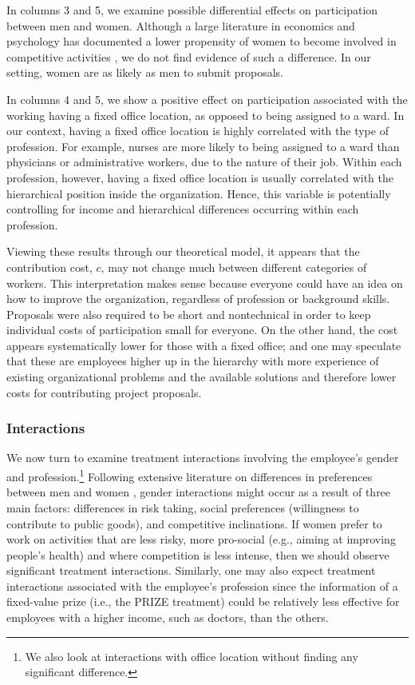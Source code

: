 \documentclass[11pt, titlepage]{article}
\begin{document}
In columns 3 and 5, we examine possible differential effects on
participation between men and women. Although a large literature in
economics and psychology \citep{croson2009gender} has documented a lower
propensity of women to become involved in competitive activities
\citep{niederle2007women}, we do not find evidence of such a difference.
In our setting, women are as likely as men to submit proposals.

In columns 4 and 5, we show a positive effect on participation
associated with the working having a fixed office location, as opposed
to being assigned to a ward. In our context, having a fixed office
location is highly correlated with the type of profession. For example,
nurses are more likely to being assigned to a ward than physicians or
administrative workers, due to the nature of their job. Within each
profession, however, having a fixed office location is usually
correlated with the hierarchical position inside the organization.
Hence, this variable is potentially controlling for income and
hierarchical differences occurring within each profession.

Viewing these results through our theoretical model, it appears that the
contribution cost, \(c\), may not change much between different
categories of workers. This interpretation makes sense because everyone
could have an idea on how to improve the organization, regardless of
profession or background skills. Proposals were also required to be
short and nontechnical in order to keep individual costs of
participation small for everyone. On the other hand, the cost appears
systematically lower for those with a fixed office; and one may
speculate that these are employees higher up in the hierarchy with more
experience of existing organizational problems and the available
solutions and therefore lower costs for contributing project proposals.

\subsubsection{Interactions}\label{interactions}

We now turn to examine treatment interactions involving the employee's
gender and profession.\footnote{We also look at interactions with office
  location without finding any significant difference.} Following
extensive literature on differences in preferences between men and women
\citep{croson2009gender}, gender interactions might occur as a result of
three main factors: differences in risk taking, social preferences
(willingness to contribute to public goods), and competitive
inclinations. If women prefer to work on activities that are less risky,
more pro-social (e.g., aiming at improving people's health) and where
competition is less intense, then we should observe significant
treatment interactions. Similarly, one may also expect treatment
interactions associated with the employee's profession since the
information of a fixed-value prize (i.e., the PRIZE treatment) could be
relatively less effective for employees with a higher income, such as
doctors, than the others.
\end{document}
